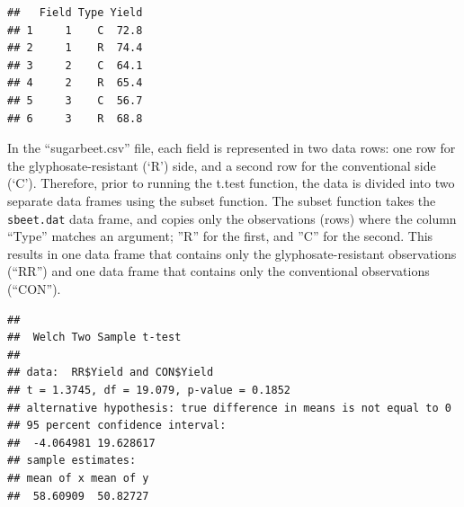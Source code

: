 \documentclass[letterpaper,]{book}
\newenvironment{Shaded}{\begin{snugshade}}{\end{snugshade}}
\newcommand{\CommentTok}[1]{\textcolor[rgb]{0.56,0.35,0.01}{\textit{#1}}}
\newcommand{\DataTypeTok}[1]{\textcolor[rgb]{0.13,0.29,0.53}{#1}}
\newcommand{\DecValTok}[1]{\textcolor[rgb]{0.00,0.00,0.81}{#1}}
\newcommand{\FloatTok}[1]{\textcolor[rgb]{0.00,0.00,0.81}{#1}}
\newcommand{\KeywordTok}[1]{\textcolor[rgb]{0.13,0.29,0.53}{\textbf{#1}}}
\newcommand{\NormalTok}[1]{#1}
\newcommand{\OperatorTok}[1]{\textcolor[rgb]{0.81,0.36,0.00}{\textbf{#1}}}
\newcommand{\StringTok}[1]{\textcolor[rgb]{0.31,0.60,0.02}{#1}}
\begin{document}
\begin{Shaded}
\end{Shaded}

\begin{verbatim}
##   Field Type Yield
## 1     1    C  72.8
## 2     1    R  74.4
## 3     2    C  64.1
## 4     2    R  65.4
## 5     3    C  56.7
## 6     3    R  68.8
\end{verbatim}

In the ``sugarbeet.csv'' file, each field is represented in two data rows: one row for the glyphosate-resistant (`R') side, and a second row for the conventional side (`C'). Therefore, prior to running the t.test function, the data is divided into two separate data frames using the subset function. The subset function takes the \texttt{sbeet.dat} data frame, and copies only the observations (rows) where the column ``Type'' matches an argument; ''R'' for the first, and ''C'' for the second. This results in one data frame that contains only the glyphosate-resistant observations (``RR'') and one data frame that contains only the conventional observations (``CON'').

\begin{Shaded}
\end{Shaded}

\begin{verbatim}
## 
##  Welch Two Sample t-test
## 
## data:  RR$Yield and CON$Yield
## t = 1.3745, df = 19.079, p-value = 0.1852
## alternative hypothesis: true difference in means is not equal to 0
## 95 percent confidence interval:
##  -4.064981 19.628617
## sample estimates:
## mean of x mean of y 
##  58.60909  50.82727
\end{verbatim}
\end{document}
